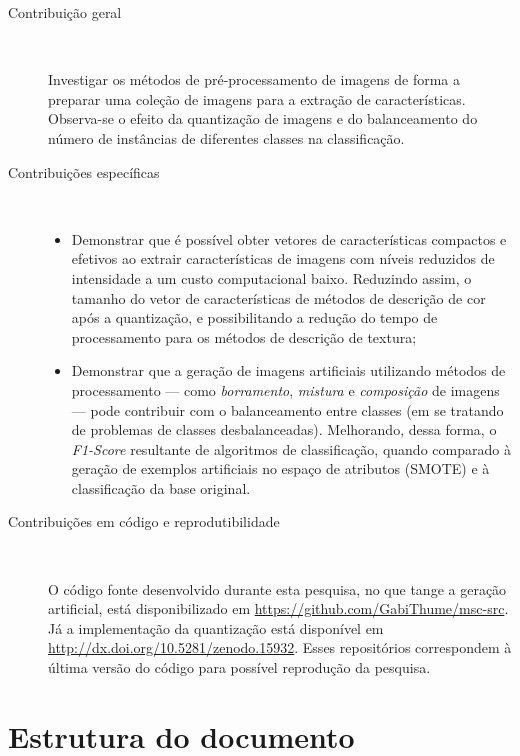 \begin{description}
\item[Contribuição geral] \

Investigar os métodos de pré-processamento de imagens de forma a preparar uma coleção de imagens para a extração de características. Observa-se o efeito da quantização de imagens e do balanceamento do número de instâncias de diferentes classes na classificação.

\item[Contribuições específicas] \

  \begin{itemize}

    \item Demonstrar que é possível obter vetores de características compactos e efetivos ao extrair características de imagens com níveis reduzidos de intensidade a um custo computacional baixo. Reduzindo assim, o tamanho do vetor de características de métodos de descrição de cor após a quantização, e possibilitando a redução do tempo de processamento para os métodos de descrição de textura;

    \item Demonstrar que a geração de imagens artificiais utilizando métodos de processamento --- como \emph{borramento}, \emph{mistura} e \emph{composição} de imagens --- pode contribuir com o balanceamento entre classes (em se tratando de problemas de classes desbalanceadas). Melhorando, dessa forma, o \textit{F1-Score} resultante de algoritmos de classificação, quando comparado à geração de exemplos artificiais no espaço de atributos (SMOTE) e à classificação da base original.

  \end{itemize}


\item[Contribuições em código e reprodutibilidade] \

O código fonte desenvolvido durante esta pesquisa, no que tange a geração artificial, está disponibilizado em \url{https://github.com/GabiThume/msc-src}. Já a implementação da quantização está disponível em \url{http://dx.doi.org/10.5281/zenodo.15932}. Esses repositórios correspondem à última versão do código para possível reprodução da pesquisa.

\end{description}

\section{Estrutura do documento}

